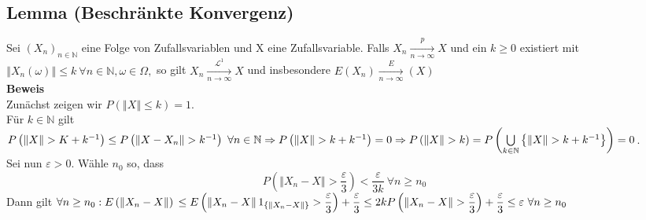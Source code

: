 \documentclass[german,10pt,oneside, fleqn, a4paper]{article}
\newcommand {\N}	{\mathbb{N}}
\newcommand{\Ra}	{\Rightarrow}
\newcommand{\brc}[1]{\left(#1\right)}
\newcommand{\brac}[1]{\left\lbrace #1\right\rbrace}
\newcommand{\CUP}[2][\infty]{\bigcup\limits_{#2}^{#1}}
\newcommand{\folge}[3][\N]{\left(#2_#3\right)_{#3\in #1}}
\newcommand{\norm}[1]{\left\Vert #1 \right\Vert}
\newcommand{\mc}[1]{\mathcal{#1}}
\newcommand{\lp}[1]{\mc{L}^{#1}}
\newcommand{\beweis}{\textbf{Beweis}\\}
\newcommand{\1}[1]{1_{#1}}
\newcommand{\2}[1]{\1{\brac{#1}}}
\newcommand{\xnorm}{\norm{X_n-X}}
\begin{document}
\subsection{Lemma (Beschränkte Konvergenz)}
\label{2.15}
Sei $\folge{X}{n}$ eine Folge von Zufallsvariablen und X eine Zufallsvariable. Falls $X_n\xrightarrow[n\rightarrow\infty]{p}X$ und ein $k\geq 0$ existiert mit $\norm{X_n(\omega)}\leq k\ \forall n\in\N,\omega\in\Omega,$ so gilt $X_n\xrightarrow[n\rightarrow\infty]{\lp{1}}X$ und insbesondere $E(X_n)\xrightarrow[n\rightarrow\infty]E(X)$\\
\beweis
Zunächst zeigen wir $P\brc{\norm{X}\leq k}=1$. \\
Für $k\in\N$ gilt \\
$P\brc{\norm{X}>K+k^{-1}}\leq P\brc{\norm{X-X_n}>k^{-1}}\ \forall n\in\N\\
\Ra P\brc{\norm{X}>k+k^{-1}}=0\\
\Ra P\brc{\norm{X}>k}=P\brc{\CUP[]{k\in\N}\brac{\norm{X}>k+k^{-1}}}=0$.\\
Sei nun $\varepsilon>0$. Wähle $n_0$ so, dass \[P\brc{\norm{X_n-X}>\dfrac{\varepsilon}{3}}<\dfrac{\varepsilon}{3k}\ \forall n\geq n_0\]
Dann gilt $\forall n\geq n_0:\\
E\brc{\norm{X_n-X}}\\\leq E\brc{\norm{X_n-X}\1{\brac{\norm{X_n-X}}}>\dfrac{\varepsilon}{3}}+\dfrac{\varepsilon}{3}\\\leq 2kP\brc{\xnorm>\dfrac{\varepsilon}{3}}+\dfrac{\varepsilon}{3}\leq\varepsilon\ \forall n\geq n_0$
\end{document}
